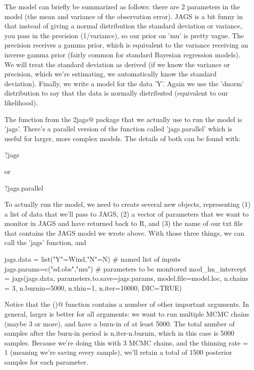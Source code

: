 The model can briefly be summarized as follows: there are 2 parameters in the model (the mean and variance of the observation error). JAGS is a bit funny in that instead of giving a normal distribution the standard deviation or variance, you pass in the precision (1/variance), so our prior on 'mu' is pretty vague. The precision receives a gamma prior, which is equivalent to the variance receiving an inverse gamma prior (fairly common for standard Bayesian regression models). We will treat the standard deviation as derived (if we know the variance or precision, which we're estimating, we automatically know the standard deviation). Finally, we write a model for the data 'Y'. Again we use the 'dnorm' distribution to say that the data is normally distributed (equivalent to our likelihood). 

The function from the \verb@R2jags@ package that we actually use to run the model is 'jags'. There's a parallel version of the function called 'jags.parallel' which is useful for larger, more complex models. The details of both can be found with: 
\begin{Schunk}
\begin{Sinput}
 ?jags 
\end{Sinput}
\end{Schunk}
or
\begin{Schunk}
\begin{Sinput}
 ?jags.parallel
\end{Sinput}
\end{Schunk}

To actually run the model, we need to create several new objects, representing (1) a list of data that we'll pass to JAGS, (2) a vector of parameters that we want to monitor in JAGS and have returned back to R, and (3) the name of our txt file that contains the JAGS model we wrote above. With those three things, we can call the 'jags' function, and 

\begin{Schunk}
\begin{Sinput}
 jags.data = list("Y"=Wind,"N"=N) # named list of inputs
 jags.params=c("sd.obs","mu") # parameters to be monitored
 mod_lm_intercept = jags(jags.data, parameters.to.save=jags.params, 
                 model.file=model.loc, n.chains = 3, n.burnin=5000,
                 n.thin=1, n.iter=10000, DIC=TRUE)  
\end{Sinput}
\end{Schunk}

Notice that the \verb@jags()@ function contains a number of other important arguments. In general, larger is better for all arguments: we want to run multiple MCMC chains (maybe 3 or more), and have a burn-in of at least 5000. The total number of samples after the burn-in period is n.iter-n.burnin, which in this case is 5000 samples. Because we're doing this with 3 MCMC chains, and the thinning rate = 1 (meaning we're saving every sample), we'll retain a total of 1500 posterior samples for each parameter.  

